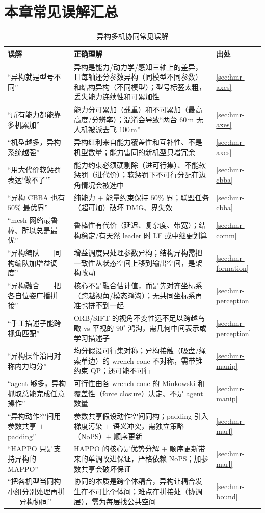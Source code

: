 \section*{本章常见误解汇总}
\label{sec:hmr-misconceptions}
\begin{table}[H]\centering\footnotesize
\caption{异构多机协同常见误解}
\label{tab:hmr-misconceptions}
\begin{tabular}{p{4.0cm}p{6.6cm}p{1.3cm}}
\toprule
误解 & 正确理解 & 出处 \\
\midrule
“异构就是型号不同” & 异构是能力/动力学/感知三轴上的差异，且每轴还分参数异构（同模型不同参数）和结构异构（不同模型）；型号标签太粗，丢失能力连续性和可累加性 & \cref{sec:hmr-axes} \\
“所有能力都能靠多机累加” & 能力分可累加（载重）和不可累加（最高高度/分辨率）；混淆会导致“两台 $60\,\mathrm{m}$ 无人机被派去飞 $100\,\mathrm{m}$” & \cref{sec:hmr-axes} \\
“机型越多，异构系统越强” & 异构红利来自能力覆盖性和互补性、不是机型数量；能力雷同的新机型只增冗余 & \cref{sec:hmr-axes} \\
“用大代价软惩罚表达‘做不了’” & 能力约束必须硬剔除（进可行集）、不能软惩罚（进代价）；软惩罚下不可行分配在边角情况会被选中 & \cref{sec:hmr-cbba} \\
“异构 CBBA 也有 $50\%$ 最优界” & 纯能力 $+$ 能量约束保持 $50\%$ 界；联盟任务（超可加）破坏 DMG、界失效 & \cref{sec:hmr-cbba} \\
“mesh 网络最鲁棒、所以总是最优” & 鲁棒性有代价（延迟、复杂度、带宽）；结构稳定/有天然 leader 时 LF 或中继更划算 & \cref{sec:hmr-comm} \\
“异构编队 $=$ 同构编队加增益调度” & 增益调度只处理参数异构；结构异构需把一致性从状态空间上移到输出空间，是架构改动 & \cref{sec:hmr-formation} \\
“异构融合 $=$ 把各自位姿广播拼接” & 核心不是融合估计值，而是先对齐坐标系（跨越视角/模态鸿沟）；无共同坐标系再准也拼不到一起 & \cref{sec:hmr-perception} \\
“手工描述子能跨视角匹配” & ORB/SIFT 的视角不变性远不足以跨越鸟瞰 vs 平视的 $90^\circ$ 鸿沟，需几何中间表示或学习描述子 & \cref{sec:hmr-perception} \\
“异构操作沿用对称内力均分” & 均分假设可行集对称；异构接触（吸盘/绳索单边）的 wrench cone 不对称，需带锥约束 QP；还可能不可行 & \cref{sec:hmr-manip} \\
“agent 够多，异构抓取总能完成任意操作” & 可行性由各 wrench cone 的 Minkowski 和覆盖性（force closure）决定、不是 agent 数量 & \cref{sec:hmr-manip} \\
“异构动作空间用参数共享 $+$ padding” & 参数共享假设动作空间同构；padding 引入梯度污染 $+$ 语义冲突，需独立策略（NoPS）$+$ 顺序更新 & \cref{sec:hmr-marl} \\
“HAPPO 只是支持异构的 MAPPO” & HAPPO 的核心是优势分解 $+$ 顺序更新带来的单调改进保证，严格依赖 NoPS；加参数共享会破坏保证 & \cref{sec:hmr-marl} \\
“把各机型当同构小组分别处理再拼 $=$ 异构协同” & 协同的本质是跨个体耦合，异构让耦合发生在不可比个体间；难点在拼接处（协调层），需为每层找公共空间 & \cref{sec:hmr-bound} \\
\bottomrule
\end{tabular}
\end{table}

